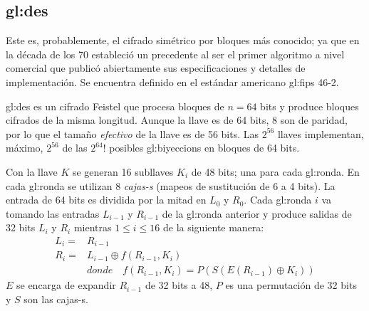 %
%

\subsection{\texorpdfstring{\acrfull{gl:des}}{Data Encryption Standard (DES)}}
\label{sec:des}

Este es, probablemente, el cifrado simétrico por bloques más conocido;
ya que en la década de los 70 estableció un precedente al ser el primer
algoritmo a nivel comercial que publicó abiertamente sus
especificaciones y detalles de implementación. Se encuentra definido
en el estándar americano \gls{gl:fips} 46-2.

\gls{gl:des} es un cifrado Feistel que procesa bloques de $n=64$ bits y
produce bloques cifrados de la misma longitud. Aunque la llave es de 64 bits,
8 son de paridad, por lo que el tamaño \textit{efectivo} de la llave es de
56 bits. Las $2^{56}$ llaves implementan, máximo, $2^{56}$ de las
$2^{64}!$ posibles \glspl{gl:biyeccion} en bloques de 64 bits.

Con la llave $K$ se generan 16 subllaves $K_i$ de 48 bits; una para cada
\gls{gl:ronda}. En cada \gls{gl:ronda} se utilizan 8 \textit{cajas-s}
(mapeos de sustitución de 6 a 4 bits). La entrada de 64 bits es dividida por la
mitad en $L_0$ y $R_0$. Cada \gls{gl:ronda} $i$ va tomando las entradas
$L_{i-1}$ y $R_{i-1}$ de la \gls{gl:ronda} anterior y produce salidas de 32
bits $L_i$ y $R_i$ mientras $1 \leq i \leq 16$ de la siguiente manera:
\begin{equation}
  \label{cifrado_des}
  \begin{aligned}
    L_i = {} & R_{i-1} \\
    R_i = {} & L_{i-1} \oplus f(R_{i-1}, K_i) \\
    & donde \quad f(R_{i-1}, K_i) = P(S(E(R_{i-1})\oplus K_i))
  \end{aligned}
\end{equation}
$E$ se encarga de expandir $R_{i-1}$ de 32 bits a 48, $P$ es una
permutación de 32 bits y $S$ son las cajas-s.


